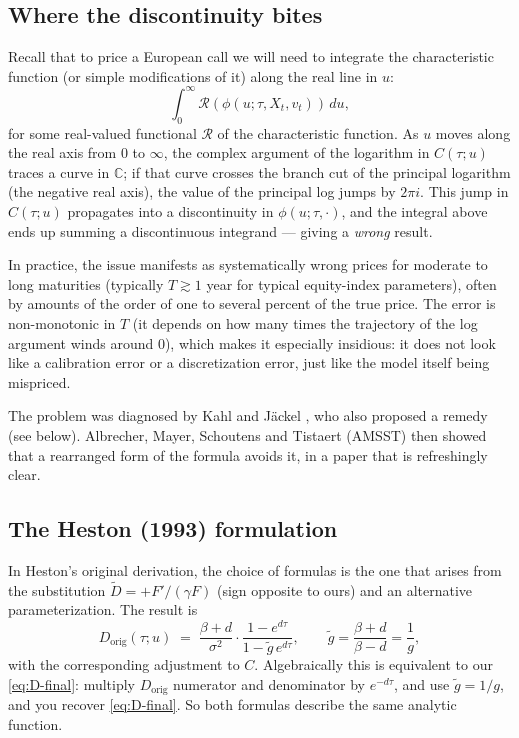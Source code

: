 \documentclass[11pt]{article}
\theoremstyle{plain}
\theoremstyle{definition}
\theoremstyle{remark}
\begin{document}
\subsection{Where the discontinuity bites}

Recall that to price a European call we will need to integrate the characteristic function (or simple modifications of it) along the real line in \(u\):
\[
    \int_0^\infty \mathcal{R}(\phi(u; \tau, X_t, v_t)) \, du,
\]
for some real-valued functional \(\mathcal{R}\) of the characteristic function. As \(u\) moves along the real axis from \(0\) to \(\infty\), the complex argument of the logarithm in \(C(\tau; u)\) traces a curve in \(\mathbb{C}\); if that curve crosses the branch cut of the principal logarithm (the negative real axis), the value of the principal log jumps by \(2\pi i\). This jump in \(C(\tau; u)\) propagates into a discontinuity in \(\phi(u; \tau, \cdot)\), and the integral above ends up summing a discontinuous integrand --- giving a \emph{wrong} result.

In practice, the issue manifests as systematically wrong prices for moderate to long maturities (typically \(T \gtrsim 1\) year for typical equity-index parameters), often by amounts of the order of one to several percent of the true price. The error is non-monotonic in \(T\) (it depends on how many times the trajectory of the log argument winds around \(0\)), which makes it especially insidious: it does not look like a calibration error or a discretization error, just like the model itself being mispriced.

The problem was diagnosed by Kahl and J\"ackel \cite{KahlJaeckel2005}, who also proposed a remedy (see below). Albrecher, Mayer, Schoutens and Tistaert (AMSST) \cite{AMSS2007} then showed that a rearranged form of the formula avoids it, in a paper that is refreshingly clear.

\subsection{The Heston (1993) formulation}

In Heston's original derivation, the choice of formulas is the one that arises from the substitution \(\tilde D = +F'/(\gamma F)\) (sign opposite to ours) and an alternative parameterization. The result is
\[
    D_{\text{orig}}(\tau; u) \;=\; \frac{\beta + d}{\sigma^2} \cdot \frac{1 - e^{d \tau}}{1 - \tilde g \, e^{d \tau}}, \qquad \tilde g = \frac{\beta + d}{\beta - d} = \frac{1}{g},
\]
with the corresponding adjustment to \(C\). Algebraically this is equivalent to our \eqref{eq:D-final}: multiply \(D_{\text{orig}}\) numerator and denominator by \(e^{-d \tau}\), and use \(\tilde g = 1/g\), and you recover \eqref{eq:D-final}. So both formulas describe the same analytic function.
\end{document}
